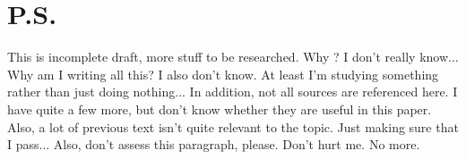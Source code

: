 \documentclass{scrartcl}
\begin{document}
\section{P.S.}
This is incomplete draft, more stuff to be researched.
Why ? I don't really know...
Why am I writing all this? I also don't know.
At least I'm studying something rather than just doing nothing...
In addition, not all sources are referenced here.
I have quite a few more, but don't know whether they are useful in this paper.
Also, a lot of previous text isn't quite relevant to the topic.
Just making sure that I pass...
Also, don't assess this paragraph, please. Don't hurt me. No more.



\end{document}

